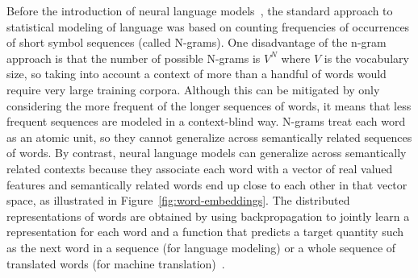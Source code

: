 \documentclass[10pts]{article}
\begin{document}
Before the introduction of neural language
models~\citep{BenDucVin01-short}, the standard approach to statistical
modeling of language was based on counting frequencies of occurrences of
short symbol sequences (called N-grams). One disadvantage of the n-gram
approach is that the number of possible N-grams is $V^N$ where $V$ is
the vocabulary size, so taking
into account a context of more than a handful of words would require
very large training corpora. Although this can
be mitigated by only considering the more frequent of the longer sequences of 
words, it means that less frequent sequences are modeled in a 
context-blind way. N-grams
treat each word as an atomic unit, so they cannot generalize across
semantically related sequences of words. By contrast,
neural language models can generalize across semantically related
contexts because they associate each word with a vector of real
valued features
and semantically related
words end up close to each other in that vector space, as illustrated in
Figure~\ref{fig:word-embeddings}. The distributed representations of
words are obtained by using backpropagation to jointly learn 
a representation for each word and
a function that predicts a target quantity such as the next word
in a sequence (for language modeling) or a whole sequence
of translated words (for machine translation)~\citep{Devlin-et-al-ACL2014,Bahdanau-et-al-arxiv2014,
Sutskever-et-al-NIPS2014}.


\begin{figure}[ht]
\end{figure}
\end{document}
